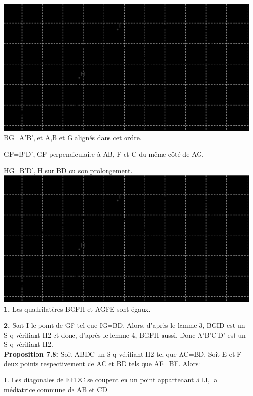 \documentclass[a4paper, 12pt, twoside]{book}
\begin{document}
   \includegraphics[scale=0.6]{figures/sacc233BIS.eps}\\
 
  BG=A'B', et A,B et G alignés dans cet ordre. \
  
  GF=B'D', GF perpendiculaire à AB,  F et C du même côté de AG,\
  
  HG=B'D', H sur BD ou son prolongement.\\
  
 
 \includegraphics[scale=0.6]{figures/sacc233BIS.eps}\\
 
 \textbf{1.} Les quadrilatères BGFH et AGFE sont égaux.\
 
 
 
 \textbf{2.} Soit I le point de GF tel que IG=BD. Alors, d'après le lemme 3, BGID est un S-q vérifiant H2 et donc, d'après le lemme 4, BGFH aussi. Donc A'B'C'D' est un S-q vérifiant H2. \\
 
 
  
 
\newpage \textbf{Proposition 7.8:} Soit ABDC un S-q vérifiant H2 tel que AC=BD. Soit E et F deux points respectivement de AC et BD tels que AE=BF. Alors:\

1. Les diagonales de EFDC se coupent en un point appartenant à IJ, la médiatrice commune de AB et CD.\
\end{document}
